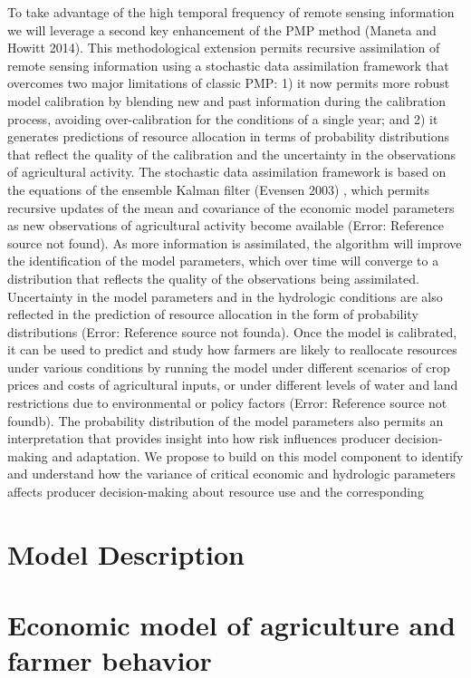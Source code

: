 \documentclass[review]{elsarticle}
\begin{document}
To take advantage of the high temporal frequency of remote sensing information we will leverage a second key enhancement of the PMP method (Maneta and Howitt 2014). This methodological extension permits recursive assimilation of remote sensing information using a stochastic data assimilation framework that overcomes two major limitations of classic PMP: 1) it now permits more robust model calibration by blending new and past information during the calibration process, avoiding over-calibration for the conditions of a single year; and 2) it generates predictions of resource allocation in terms of probability distributions that reflect the quality of the calibration and the uncertainty in the observations of agricultural activity.
The stochastic data assimilation framework is based on the equations of the ensemble Kalman filter (Evensen 2003) , which permits recursive updates of the mean and covariance of the economic model parameters as new observations of agricultural activity become available (Error: Reference source not found).  As more information is assimilated, the algorithm will improve the identification of the model parameters, which over time will converge to a distribution that reflects the quality of the observations being assimilated. Uncertainty in the model parameters and in the hydrologic conditions are also reflected in the prediction of resource allocation in the form of probability distributions (Error: Reference source not founda). Once the model is calibrated, it can be used to predict and study how farmers are likely to reallocate resources under various conditions by running the model under different scenarios of crop prices and costs of agricultural inputs, or under different levels of water and land restrictions due to environmental or policy factors (Error: Reference source not foundb). The probability distribution of the model parameters also permits an interpretation that provides insight into how risk influences producer decision-making and adaptation. We propose to build on this model component to identify and understand how the variance of critical economic and hydrologic parameters affects producer decision-making about resource use and the corresponding

\section{Model Description}

\section{Economic model of agriculture and farmer behavior}
\end{document}
